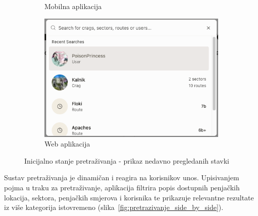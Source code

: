 \begin{figure}[H]
\begin{subfigure}[b]{0.35\textwidth}
        \caption{Mobilna aplikacija}
        \label{fig:pretrazivanje_default}
    \end{subfigure}
    \hfill
    \begin{subfigure}[b]{0.6\textwidth}
        \centering
        \includegraphics[width=\textwidth]{images/implementacija/web/search_default.png}
        \caption{Web aplikacija}
        \label{fig:pretrazivanje_searching}
    \end{subfigure}
    \caption{Inicijalno stanje pretraživanja - prikaz nedavno pregledanih stavki}
    \label{fig:pretrazivanje_sidebyside}
\end{figure}

Sustav pretraživanja je dinamičan i reagira na korisnikov unos. Upisivanjem pojma u traku za pretraživanje, aplikacija filtrira popis dostupnih penjačkih lokacija, sektora, penjačkih smjerova i korisnika te prikazuje relevantne rezultate iz više kategorija istovremeno (slika~\ref{fig:pretrazivanje_side_by_side}). 

